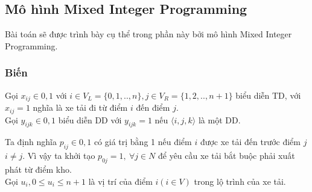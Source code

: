 \documentclass[a4paper,12pt]{report}
\begin{document}
\subsection{Mô hình Mixed Integer Programming }
Bài toán sẽ được trình bày cụ thể trong phần này bởi mô hình Mixed Integer Programming.
\subsubsection{Biến}
Gọi $x_{ij} \in {0,1}$ với $i \in V_L= \{0,1,..,n\}, j \in V_R= \{1,2,..,n+1\}$ biểu diễn \ac{TD}, với $x_{ij}=1$ nghĩa là xe tải đi từ điểm $i$ đến điểm $j$.\\

Gọi $y_{ijk} \in {0,1}$ biểu diễn \ac{DD} với $y_{ijk}=1$ nếu $\langle i,j,k \rangle$ là một \ac{DD}.

Ta định nghĩa $p_{ij} \in {0,1}$ có giá trị bằng 1 nếu điểm $i$ được xe tải đến trước điểm $j$ $i \neq j$. Vì vậy ta khởi tạo $p_{0j}=1, \ \forall j \in N$ để yêu cầu xe tải bắt buộc phải xuất phát từ điểm kho. \\

Gọi $u_i, 0\leq u_i \leq n+1$ là vị trí của điểm $i (i \in V)$ trong lộ trình của xe tải.
\end{document}
